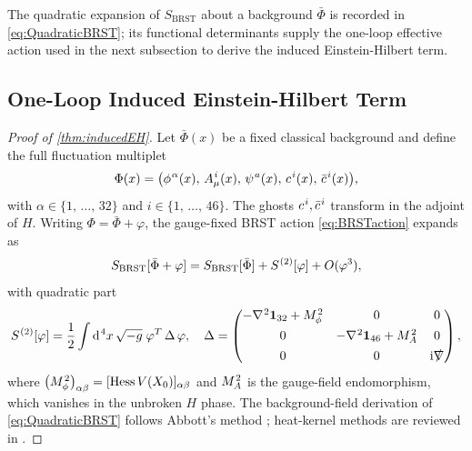\documentclass[pdflatex,sn-mathphys-num]{sn-jnl}
\theoremstyle{thmstyleone}
\theoremstyle{thmstyletwo}%
\theoremstyle{thmstylethree}%
\newcommand{\sm}{\hspace{.065em}}
\newcommand{\smexp}[1]{^{\sm #1}}
\newcommand{\dv}[1]{\mathrm{d}\smexp{#1}}
\begin{document}
\begin{appendices}
The quadratic expansion of \(S_{\text{BRST}}\) about a background
\(\bar\Phi\) is recorded in \eqref{eq:QuadraticBRST}; its functional
determinants supply the one-loop effective action used in the next
subsection to derive the induced Einstein-Hilbert term.


\subsection{One-Loop Induced Einstein-Hilbert Term}
\label{app:Gravity:InducedEH}

\begin{proof}[Proof of \autoref{thm:inducedEH}]
Let \(\bar\Phi(x)\) be a fixed classical background and define the full
fluctuation multiplet
\[
  \Phi(x)=\bigl(\phi\smexp{\alpha}(x),\,
                A_{\mu}\smexp{i}(x),\,
                \psi\smexp{a}(x),\,
                c\smexp{i}(x),\,
                \bar c\smexp{i}(x)\bigr),
\]
with
\(
  \alpha\in \{1,\,\dots,\,32\}
\)
and
\(
  i\in\{1,\,\dots,\,46\}
\).
The ghosts \(c\smexp{i},\bar c\smexp{i}\) transform in the adjoint of
\(H\). Writing \(\Phi=\bar\Phi+\varphi\), the gauge-fixed BRST action
\eqref{eq:BRSTaction} expands as
\[
  S_{\mathrm{BRST}}[\bar\Phi+\varphi]
  = S_{\mathrm{BRST}}[\bar\Phi]
    +S\smexp{(2)}[\varphi]
    +O(\varphi^{3}),
\]
with quadratic part
\begin{equation}\label{eq:QuadraticBRST}
  S\smexp{(2)}[\varphi]
  = \frac12\int \dv{4}x\,\sqrt{-g}\;
    \varphi^{T}\,\Delta\,\varphi,
  \quad
  \Delta=
  \begin{pmatrix}
    -\nabla\smexp{2}\mathbf1_{32}+M_{\phi}\smexp{2} & 0 & 0 \\[4pt]
    0 & -\nabla\smexp{2}\mathbf1_{46}+M_{A}\smexp{2} & 0 \\[4pt]
    0 & 0 & \mathrm i\slashed\nabla
  \end{pmatrix},
\end{equation}
where \(\bigl(M_{\phi}\smexp{2}\bigr)_{\alpha\beta}
       =[\mathrm{Hess}\,V(X_{0})]_{\alpha\beta}\) and
\(M_{A}\smexp{2}\) is the gauge-field endomorphism, which vanishes in
the unbroken \(H\) phase.  The background-field derivation of
\eqref{eq:QuadraticBRST} follows Abbott’s method \cite{Abbott:1981ke};
heat-kernel methods are reviewed in \cite{Vassilevich:2003xt}.


\end{proof}
\end{appendices}
\end{document}
